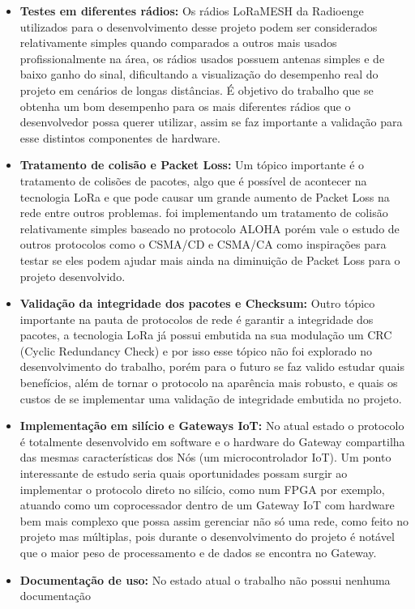 \begin{itemize}
    \item \textbf{Testes em diferentes rádios:} Os rádios LoRaMESH da Radioenge utilizados para o desenvolvimento desse projeto podem ser considerados relativamente simples quando comparados a outros
    mais usados profissionalmente na área, os rádios usados possuem antenas simples e de baixo ganho
    do sinal, dificultando a visualização do desempenho real do projeto em cenários de longas
    distâncias. É objetivo do trabalho que se obtenha um bom desempenho para os mais
    diferentes rádios que o desenvolvedor possa querer utilizar, assim se faz importante
    a validação para esse distintos componentes de hardware.
    \item \textbf{Tratamento de colisão e Packet Loss:} Um tópico importante é o tratamento de colisões de pacotes, algo que é possível de acontecer na tecnologia LoRa e que pode causar um grande aumento de Packet Loss na rede entre outros problemas. foi implementando um tratamento de colisão relativamente simples baseado no protocolo ALOHA porém vale o estudo de outros protocolos como
    o CSMA/CD e CSMA/CA como inspirações para testar se eles podem ajudar mais ainda na diminuição
    de Packet Loss para o projeto desenvolvido.
    \item \textbf{Validação da integridade dos pacotes e Checksum:} Outro tópico importante na
    pauta de protocolos de rede é garantir a integridade dos pacotes, a tecnologia LoRa já
    possui embutida na sua modulação um CRC (Cyclic Redundancy Check) e por isso esse tópico
    não foi explorado no desenvolvimento do trabalho, porém para o futuro se faz valido estudar
    quais benefícios, além de tornar o protocolo na aparência mais robusto, e quais os custos de se implementar uma validação de integridade embutida no projeto.
    \item \textbf{Implementação em silício e Gateways IoT:} No atual estado o protocolo é totalmente
    desenvolvido em software e o hardware do Gateway compartilha das mesmas características dos Nós (um microcontrolador IoT). Um ponto interessante de estudo seria quais oportunidades possam surgir
    ao implementar o protocolo direto no silício, como num FPGA por exemplo, atuando como um coprocessador
    dentro de um Gateway IoT com hardware bem mais complexo que possa assim gerenciar não só uma rede,
    como feito no projeto mas múltiplas, pois durante o desenvolvimento do projeto é notável que o
    maior peso de processamento e de dados se encontra no Gateway.
    \item \textbf{Documentação de uso:} No estado atual o trabalho não possui nenhuma documentação 

\end{itemize}
